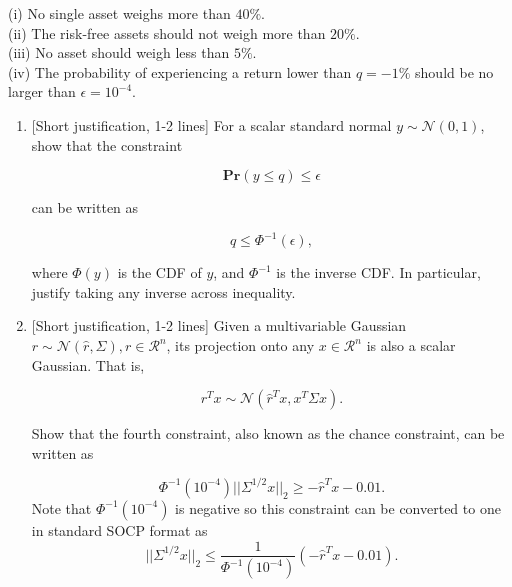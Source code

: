 (i) No single asset weighs more than $40\%$. \\ 
(ii) The risk-free assets should not weigh more than $20\%$. \\ 
(iii) No asset should weigh less than $5\%$. \\ 
(iv) The probability of experiencing a return lower than $q = -1\%$ should be no larger than $\epsilon = 10^{-4}$.
\begin{enumerate}

\item {[Short justification, 1-2 lines]} For a scalar standard normal $y \sim \mathcal{N}(0, 1)$, show that the constraint

\begin{equation*}
    \textbf{Pr}(y \leq q) \leq \epsilon
\end{equation*}

can be written as

\begin{equation*}
    q \leq \Phi^{-1}(\epsilon),
\end{equation*}

where $\Phi(y)$ is the CDF of $y$, and $\Phi^{-1}$ is the inverse CDF. In particular, justify taking any inverse across inequality.

\newline
\sol{}
\newline

\item {[Short justification, 1-2 lines]} Given a multivariable Gaussian $r \sim \mathcal{N}(\hat{r}, \Sigma),r \in \mathcal{R}^n$, its projection onto any $x \in \mathcal{R}^n$ is also a scalar Gaussian. That is,

\begin{equation*}
    r^Tx \sim \mathcal{N}(\hat{r}^Tx, x^T \Sigma x).
\end{equation*}

Show that the fourth constraint, also known as the chance constraint, can be written as 

\begin{equation*}
\Phi^{-1}(10^{-4})||\Sigma^{1/2}x||_2 \geq -\hat{r}^Tx - 0.01.
\end{equation*}
Note that $\Phi^{-1}(10^{-4})$ is negative so this constraint can be converted to one in standard SOCP format as 
\begin{equation*}
||\Sigma^{1/2}x||_2 \leq \frac{1}{\Phi^{-1}(10^{-4})}(-\hat{r}^Tx - 0.01).
\end{equation*}


\end{enumerate}
